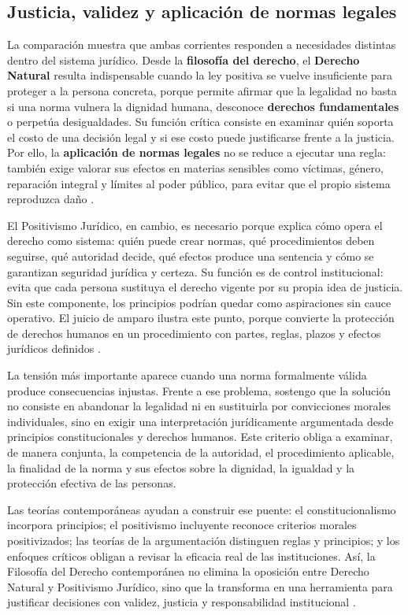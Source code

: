 \documentclass[
	spanish, %
	letterpaper, oneside
]{article}
\begin{document}
\subsection{Justicia, validez y aplicación de normas legales}

La comparación muestra que ambas corrientes responden a necesidades distintas dentro del sistema jurídico. Desde la \textbf{filosofía del derecho}, el \textbf{Derecho Natural} resulta indispensable cuando la ley positiva se vuelve insuficiente para proteger a la persona concreta, porque permite afirmar que la legalidad no basta si una norma vulnera la dignidad humana, desconoce \textbf{derechos fundamentales} o perpetúa desigualdades. Su función crítica consiste en examinar quién soporta el costo de una decisión legal y si ese costo puede justificarse frente a la justicia. Por ello, la \textbf{aplicación de normas legales} no se reduce a ejecutar una regla: también exige valorar sus efectos en materias sensibles como víctimas, género, reparación integral y límites al poder público, para evitar que el propio sistema reproduzca daño \citep{LeyGeneralVictimas,franzoniacevedoLeyGeneralAcceso2017}.

El Positivismo Jurídico, en cambio, es necesario porque explica cómo opera el derecho como sistema: quién puede crear normas, qué procedimientos deben seguirse, qué autoridad decide, qué efectos produce una sentencia y cómo se garantizan seguridad jurídica y certeza. Su función es de control institucional: evita que cada persona sustituya el derecho vigente por su propia idea de justicia. Sin este componente, los principios podrían quedar como aspiraciones sin cauce operativo. El juicio de amparo ilustra este punto, porque convierte la protección de derechos humanos en un procedimiento con partes, reglas, plazos y efectos jurídicos definidos \citep{LeyAmparoReglamentaria}.

La tensión más importante aparece cuando una norma formalmente válida produce consecuencias injustas. Frente a ese problema, sostengo que la solución no consiste en abandonar la legalidad ni en sustituirla por convicciones morales individuales, sino en exigir una interpretación jurídicamente argumentada desde principios constitucionales y derechos humanos. Este criterio obliga a examinar, de manera conjunta, la competencia de la autoridad, el procedimiento aplicable, la finalidad de la norma y sus efectos sobre la dignidad, la igualdad y la protección efectiva de las personas.

Las teorías contemporáneas ayudan a construir ese puente: el constitucionalismo incorpora principios; el positivismo incluyente reconoce criterios morales positivizados; las teorías de la argumentación distinguen reglas y principios; y los enfoques críticos obligan a revisar la eficacia real de las instituciones. Así, la Filosofía del Derecho contemporánea no elimina la oposición entre Derecho Natural y Positivismo Jurídico, sino que la transforma en una herramienta para justificar decisiones con validez, justicia y responsabilidad institucional \citep{rojas-gonzalezFilosofiaDerecho2018,ruizrodriguezFilosofiaDerecho2009}.
\end{document}
